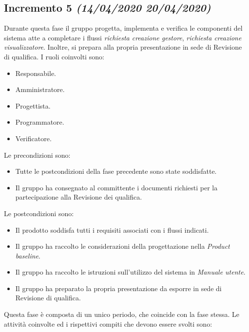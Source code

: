 \documentclass[../piano-di-progetto.tex]{subfiles}
\begin{document}
\subsection[Incremento 5]{Incremento 5 {\normalsize\normalfont\itshape(14/04/2020  20/04/2020)}}%
\label{sub:incremento_5}
Durante questa fase il gruppo progetta, implementa e verifica le componenti del sistema atte a completare i flussi \textit{richiesta creazione gestore}, \textit{richiesta creazione visualizzatore}. Inoltre, si prepara alla propria presentazione in sede di Revisione di qualifica.
I ruoli coinvolti sono:
\begin{itemize}
  \item Responsabile.
  \item Amministratore.
  \item Progettista.
  \item Programmatore.
  \item Verificatore.
\end{itemize}
Le precondizioni sono:
\begin{itemize}
  \item Tutte le postcondizioni della fase precedente sono state soddisfatte.
  \item Il gruppo ha consegnato al committente i documenti richiesti per la partecipazione alla Revisione dei qualifica.
\end{itemize}
Le postcondizioni sono:
\begin{itemize}
  \item Il prodotto soddisfa tutti i requisiti associati con i flussi indicati.
  \item Il gruppo ha raccolto le considerazioni della progettazione nella \textit{Product baseline}.
  \item Il gruppo ha raccolto le istruzioni sull'utilizzo del sistema in \textit{Manuale utente}.
  \item Il gruppo ha preparato la propria presentazione da esporre in sede di Revisione di qualifica.
\end{itemize}
Questa fase è composta di un unico periodo, che coincide con la fase stessa.
Le attività coinvolte ed i rispettivi compiti che devono essere svolti sono:
\end{document}
